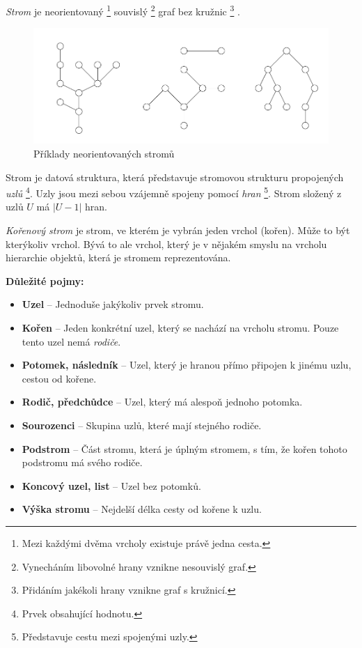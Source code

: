 \documentclass[
  biblatex=false,
  font=serif,
  glossaries=false,
  tables=false,
  theorems=false,
  index
]{kidiplom}
\begin{document}
\begin{definition}[Strom]
\indent \textit{Strom} je neorientovaný \footnote{Mezi každými dvěma vrcholy existuje právě jedna cesta.} souvislý \footnote{Vynecháním libovolné hrany vznikne nesouvislý graf.} graf bez kružnic \footnote{Přidáním jakékoli hrany vznikne graf s kružnicí.} \cite{belohlavekALM}.
\end{definition}
\begin{figure}[h!]
\centering
	\includegraphics[scale=0.6]{obrazky/1Stromy.png}
	\caption{Příklady neorientovaných stromů}
\end{figure}

\medskip
\noindent Strom je datová struktura, která představuje stromovou strukturu propojených \textit{uzlů} \footnote{Prvek obsahující hodnotu.}. Uzly jsou mezi sebou vzájemně spojeny pomocí \textit{hran} \footnote{Představuje cestu mezi spojenými uzly.}. Strom složený z uzlů $U$ má $|U - 1|$ hran.


\begin{definition}
\indent \textit{Kořenový strom} je strom, ve kterém je vybrán jeden vrchol (kořen). Může to být kterýkoliv vrchol. Bývá to ale vrchol, který je v nějakém smyslu na vrcholu hierarchie objektů, která je stromem reprezentována.
\cite{belohlavekALM}
\end{definition}
\smallskip

\newpage
\noindent \textbf{Důležité pojmy:}
\begin{itemize}
\item \textbf{Uzel} -- Jednoduše jakýkoliv prvek stromu.
\item \textbf{Kořen} -- Jeden konkrétní uzel, který se nachází na vrcholu stromu. Pouze tento uzel nemá \textit{rodiče}. 
\item \textbf{Potomek, následník} -- Uzel, který je hranou přímo připojen k jinému uzlu, cestou od kořene.
\item \textbf{Rodič, předchůdce} -- Uzel, který má alespoň jednoho potomka.
\item \textbf{Sourozenci} -- Skupina uzlů, které mají stejného rodiče.
\item \textbf{Podstrom} -- Část stromu, která je úplným stromem, s tím, že kořen tohoto podstromu má svého rodiče.
\item \textbf{Koncový uzel, list} -- Uzel bez potomků. 
\item \textbf{Výška stromu} -- Nejdelší délka cesty od kořene k uzlu.
\end{itemize} 
\end{document}
